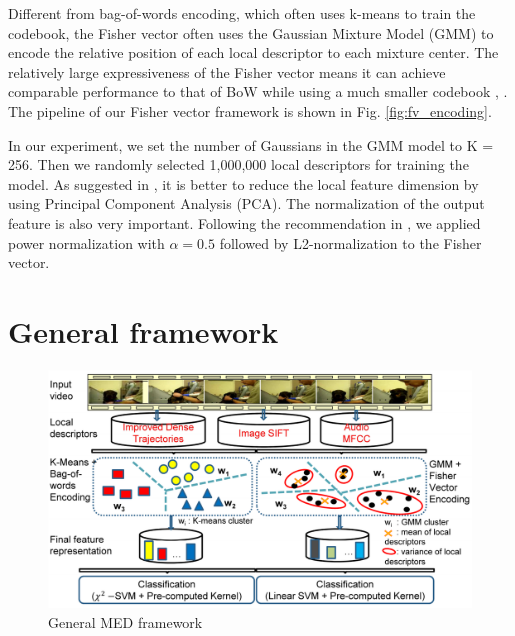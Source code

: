 Different from bag-of-words encoding, which often uses k-means to train the codebook, the Fisher vector often uses the Gaussian Mixture Model (GMM) to encode the relative position of each local descriptor to each mixture center. The relatively large expressiveness of the Fisher vector means it can achieve comparable performance to that of BoW while using a much smaller codebook \cite{sanchez2013image}, \cite{sun2013large}. The pipeline of our Fisher vector framework is shown in Fig. \ref{fig:fv_encoding}.

In our experiment, we set the number of Gaussians in the GMM model to K = 256. Then we randomly selected 1,000,000 local descriptors for training the model. As suggested in \cite{perronnin2010improving}, it is better to reduce the local feature dimension by using Principal Component Analysis (PCA). The normalization of the output feature is also very important. Following the recommendation in \cite{perronnin2010improving}, we applied power normalization with $\alpha=0.5$ followed by L2-normalization to the Fisher vector.


\section{General framework}
\begin{figure}
	\centering
	\includegraphics[width=1\textwidth]{framework.pdf}
	\caption{General MED framework}
	\label{med_framework}
\end{figure}



